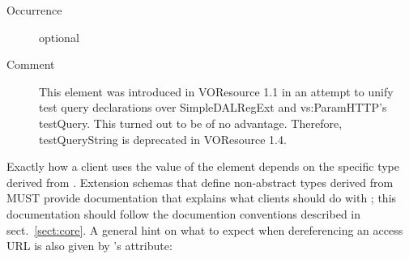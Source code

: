 \documentclass[11pt,a4paper]{ivoa}
\begin{document}
\begin{generated}
\begin{bigdescription}
\begin{description}
\item[Occurrence] optional
\item[Comment]
               	  This element was introduced in VOResource 1.1 in an
               	  attempt to unify test query declarations over
               	  SimpleDALRegExt and vs:ParamHTTP's testQuery.  This
               	  turned out to be of no advantage.  Therefore, testQueryString
               	  is deprecated in VOResource 1.4.


\end{description}


\end{bigdescription}\endgroup

\endgroup
\end{generated}



Exactly how a client uses the value
of the  element depends on the specific
type derived from .  Extension schemas that
define non-abstract types derived from  MUST
provide documentation that explains what clients should do with
; this documentation should follow the
documention conventions described in sect.~\ref{sect:core}.
A general hint on what to expect when dereferencing an access URL is
also given by 's  attribute:
\end{document}
